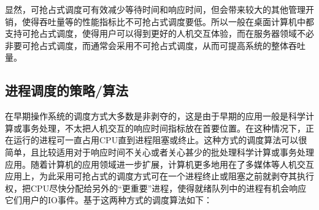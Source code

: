 显然，可抢占式调度可有效减少等待时间和响应时间，但会带来较大的其他管理开销，使得吞吐量等的性能指标比不可抢占式调度要低。所以一般在桌面计算机中都支持可抢占式调度，使得用户可以得到更好的人机交互体验，而在服务器领域不必非要可抢占式调度，而通常会采用不可抢占式调度，从而可提高系统的整体吞吐量。

\subsection{进程调度的策略/算法}\label{ux8fdbux7a0bux8c03ux5ea6ux7684ux7b56ux7565ux7b97ux6cd5}

在早期操作系统的调度方式大多数是非剥夺的，这是由于早期的应用一般是科学计算或事务处理，不太把人机交互的响应时间指标放在首要位置。在这种情况下，正在运行的进程可一直占用CPU直到进程阻塞或终止。这种方式的调度算法可以很简单，且比较适用对于响应时间不关心或者关心甚少的批处理科学计算或事务处理应用。随着计算机的应用领域进一步扩展，计算机更多地用在了多媒体等人机交互应用上，为此采用可抢占式的调度方式可在一个进程终止或阻塞之前就剥夺其执行权，把CPU尽快分配给另外的``更重要''进程，使得就绪队列中的进程有机会响应它们用户的IO事件。基于这两种方式的调度算法如下：

